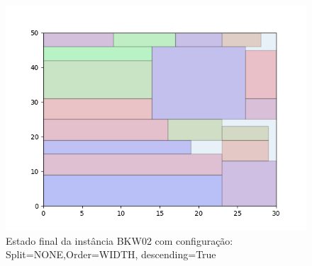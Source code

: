 \begin{figure}[H]
    \centering
    \caption[]{Estado final da instância BKW02 com configuração: Split=NONE,Order=WIDTH, descending=True}
    \label{fig:bkw02-none-width-true}
    \includegraphics[scale=0.5]{output/figures/bkw/bkw02/none/width/true/00}
\end{figure}